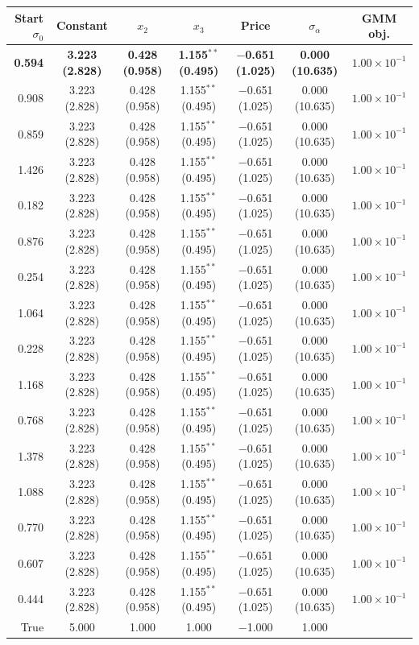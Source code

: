 \begin{tabular}{rcccccc}
\toprule
Start $\sigma_0$ & Constant & $x_2$ & $x_3$ & Price & $\sigma_\alpha$ & GMM obj. \\
\midrule
\textbf{0.594} & \textbf{3.223 (2.828)} & \textbf{0.428 (0.958)} & \textbf{1.155$^{**}$ (0.495)} & \textbf{$-$0.651 (1.025)} & \textbf{0.000 (10.635)} & \textbf{$1.00\times10^{-1}$} \\
0.908 & 3.223 (2.828) & 0.428 (0.958) & 1.155$^{**}$ (0.495) & $-$0.651 (1.025) & 0.000 (10.635) & $1.00\times10^{-1}$ \\
0.859 & 3.223 (2.828) & 0.428 (0.958) & 1.155$^{**}$ (0.495) & $-$0.651 (1.025) & 0.000 (10.635) & $1.00\times10^{-1}$ \\
1.426 & 3.223 (2.828) & 0.428 (0.958) & 1.155$^{**}$ (0.495) & $-$0.651 (1.025) & 0.000 (10.635) & $1.00\times10^{-1}$ \\
0.182 & 3.223 (2.828) & 0.428 (0.958) & 1.155$^{**}$ (0.495) & $-$0.651 (1.025) & 0.000 (10.635) & $1.00\times10^{-1}$ \\
0.876 & 3.223 (2.828) & 0.428 (0.958) & 1.155$^{**}$ (0.495) & $-$0.651 (1.025) & 0.000 (10.635) & $1.00\times10^{-1}$ \\
0.254 & 3.223 (2.828) & 0.428 (0.958) & 1.155$^{**}$ (0.495) & $-$0.651 (1.025) & 0.000 (10.635) & $1.00\times10^{-1}$ \\
1.064 & 3.223 (2.828) & 0.428 (0.958) & 1.155$^{**}$ (0.495) & $-$0.651 (1.025) & 0.000 (10.635) & $1.00\times10^{-1}$ \\
0.228 & 3.223 (2.828) & 0.428 (0.958) & 1.155$^{**}$ (0.495) & $-$0.651 (1.025) & 0.000 (10.635) & $1.00\times10^{-1}$ \\
1.168 & 3.223 (2.828) & 0.428 (0.958) & 1.155$^{**}$ (0.495) & $-$0.651 (1.025) & 0.000 (10.635) & $1.00\times10^{-1}$ \\
0.768 & 3.223 (2.828) & 0.428 (0.958) & 1.155$^{**}$ (0.495) & $-$0.651 (1.025) & 0.000 (10.635) & $1.00\times10^{-1}$ \\
1.378 & 3.223 (2.828) & 0.428 (0.958) & 1.155$^{**}$ (0.495) & $-$0.651 (1.025) & 0.000 (10.635) & $1.00\times10^{-1}$ \\
1.088 & 3.223 (2.828) & 0.428 (0.958) & 1.155$^{**}$ (0.495) & $-$0.651 (1.025) & 0.000 (10.635) & $1.00\times10^{-1}$ \\
0.770 & 3.223 (2.828) & 0.428 (0.958) & 1.155$^{**}$ (0.495) & $-$0.651 (1.025) & 0.000 (10.635) & $1.00\times10^{-1}$ \\
0.607 & 3.223 (2.828) & 0.428 (0.958) & 1.155$^{**}$ (0.495) & $-$0.651 (1.025) & 0.000 (10.635) & $1.00\times10^{-1}$ \\
0.444 & 3.223 (2.828) & 0.428 (0.958) & 1.155$^{**}$ (0.495) & $-$0.651 (1.025) & 0.000 (10.635) & $1.00\times10^{-1}$ \\
\midrule
True & 5.000 & 1.000 & 1.000 & $-$1.000 & 1.000 &  \\
\bottomrule
\end{tabular}
